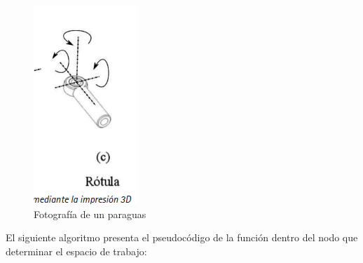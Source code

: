          \begin{figure}[htb]
                \centering
                \includegraphics[width=0.1\linewidth]{Main/Chapter6/Images6/cap6_ws_4.png}
                \caption{Fotografía de un paraguas}
                \label{f:Cap6_ws_4}
            \end{figure}    
    
        \newpage

    El siguiente algoritmo presenta el pseudocódigo de la función dentro del nodo que determinar el espacio de trabajo:
    
